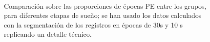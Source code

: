 \begin{figure}
\centering
\\
\caption{Comparaci\'on sobre las proporciones de \'epocas PE entre los grupos, para diferentes
etapas de sue\~no; se han usado los datos calculados con la segmentaci\'on de los
registros en \'epocas de 30s y 10 s replicando un detalle t\'ecnico.}
\label{FGH_especial}
\end{figure}

